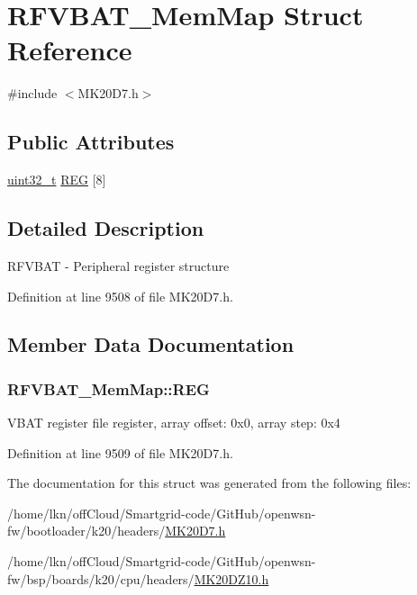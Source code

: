 \hypertarget{struct_r_f_v_b_a_t___mem_map}{}\section{R\+F\+V\+B\+A\+T\+\_\+\+Mem\+Map Struct Reference}
\label{struct_r_f_v_b_a_t___mem_map}


{\ttfamily \#include $<$M\+K20\+D7.\+h$>$}

\subsection*{Public Attributes}
\begin{DoxyCompactItemize}
\item 
\hyperlink{_p_e___types_8h_a33594304e786b158f3fb30289278f5af}{uint32\+\_\+t} \hyperlink{struct_r_f_v_b_a_t___mem_map_a3b9257d9f8b512389eea7f94a3c42ecd}{R\+EG} \mbox{[}8\mbox{]}
\end{DoxyCompactItemize}


\subsection{Detailed Description}
R\+F\+V\+B\+AT -\/ Peripheral register structure 

Definition at line 9508 of file M\+K20\+D7.\+h.



\subsection{Member Data Documentation}
\subsubsection[{\texorpdfstring{R\+EG}{REG}}]{ R\+F\+V\+B\+A\+T\+\_\+\+Mem\+Map\+::\+R\+EG}\hypertarget{struct_r_f_v_b_a_t___mem_map_a3b9257d9f8b512389eea7f94a3c42ecd}{}\label{struct_r_f_v_b_a_t___mem_map_a3b9257d9f8b512389eea7f94a3c42ecd}
V\+B\+AT register file register, array offset\+: 0x0, array step\+: 0x4 

Definition at line 9509 of file M\+K20\+D7.\+h.



The documentation for this struct was generated from the following files\+:\begin{DoxyCompactItemize}
\item 
/home/lkn/off\+Cloud/\+Smartgrid-\/code/\+Git\+Hub/openwsn-\/fw/bootloader/k20/headers/\hyperlink{bootloader_2k20_2headers_2_m_k20_d7_8h}{M\+K20\+D7.\+h}\item 
/home/lkn/off\+Cloud/\+Smartgrid-\/code/\+Git\+Hub/openwsn-\/fw/bsp/boards/k20/cpu/headers/\hyperlink{_m_k20_d_z10_8h}{M\+K20\+D\+Z10.\+h}\end{DoxyCompactItemize}
